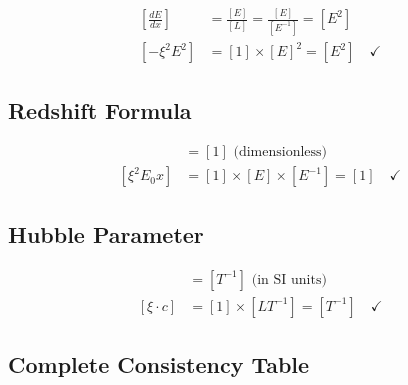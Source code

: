 \documentclass[12pt,a4paper]{report}
\begin{document}
	\begin{align}
		\left[\frac{dE}{dx}\right] &= \frac{[E]}{[L]} = \frac{[E]}{[E^{-1}]} = [E^2] \\
		\left[-\xi^2 E^2\right] &= [1] \times [E]^2 = [E^2] \quad \checkmark
	\end{align}
	
	\subsection{Redshift Formula}
	
	\begin{align}
		[z] &= [1] \text{ (dimensionless)} \\
		[\xi^2 E_0 x] &= [1] \times [E] \times [E^{-1}] = [1] \quad \checkmark
	\end{align}
	
	\subsection{Hubble Parameter}
	
	\begin{align}
		[H_0] &= [T^{-1}] \text{ (in SI units)} \\
		[\xi \cdot c] &= [1] \times [LT^{-1}] = [T^{-1}] \quad \checkmark
	\end{align}
	
	\subsection{Complete Consistency Table}
	
	\begin{table}[htbp]
		\centering
		\caption{Dimensional consistency verification}
		\label{tab:dimensional_check}
	\end{table}
	
\end{document}
